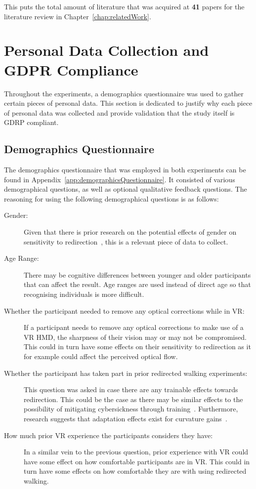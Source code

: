 This puts the total amount of literature that was acquired at \textbf{41} papers for the literature review in Chapter~\ref{chap:relatedWork}.

\section{Personal Data Collection and GDPR Compliance}
Throughout the experiments, a demographics questionnaire was used to gather certain pieces of personal data. This section is dedicated to justify why each piece of personal data was collected and provide validation that the study itself is GDRP compliant. 

\subsection{Demographics Questionnaire}
The demographics questionnaire that was employed in both experiments can be found in Appendix~\ref{app:demographicsQuestionnaire}. It consisted of various demographical questions, as well as optional qualitative feedback questions. The reasoning for using the following demographical questions is as follows:

\begin{description}
   \item[Gender:] Given that there is prior research on the potential effects of gender on sensitivity to redirection~\cite{nguyen2018individual}, this is a relevant piece of data to collect. 
   \item[Age Range:] There may be cognitive differences between younger and older participants that can affect the result. Age ranges are used instead of direct age so that recognising individuals is more difficult. 
   \item[Whether the participant needed to remove any optical corrections while in VR:] If a participant needs to remove any optical corrections to make use of a VR HMD, the sharpness of their vision may or may not be compromised. This could in turn have some effects on their sensitivity to redirection as it for example could affect the perceived optical flow. 
   \item[Whether the participant has taken part in prior redirected walking experiments:] This question was asked in case there are any trainable effects towards redirection. This could be the case as there may be similar effects to the possibility of mitigating cybersickness through training~\cite{hildebrandt2018get}. Furthermore, research suggests that adaptation effects exist for curvature gains~\cite{nguyen2018individual}.
   \item[How much prior VR experience the participants considers they have:] In a similar vein to the previous question, prior experience with VR could have some effect on how comfortable participants are in VR. This could in turn have some effects on how comfortable they are with using redirected walking.
\end{description}


